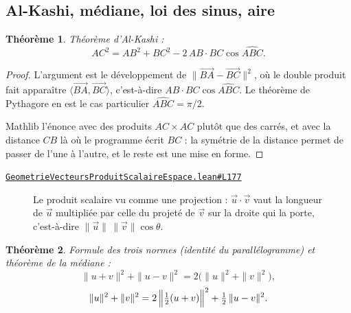 \documentclass[11pt,a4paper]{article}
\theoremstyle{definition}
\theoremstyle{plain}
\newtheorem{theoreme}{Théorème}
\newcommand{\source}[2]{\par\smallskip\noindent\hfill{\footnotesize\href{#1}{\texttt{#2}}}\par\smallskip}
\begin{document}
\subsection{Al-Kashi, médiane, loi des sinus, aire}

\begin{theoreme}
Théorème d'Al-Kashi :
\[ AC^{2} = AB^{2} + BC^{2} - 2\,AB \cdot BC \cos\widehat{ABC} . \]
\end{theoreme}

\begin{proof}
L'argument est le développement de
$\|\overrightarrow{BA} - \overrightarrow{BC}\|^{2}$, où le double produit fait apparaître
$\langle \overrightarrow{BA}, \overrightarrow{BC}\rangle$, c'est-à-dire
$AB \cdot BC \cos\widehat{ABC}$. Le théorème de Pythagore en est le cas particulier
$\widehat{ABC} = \pi/2$.

\medskip\noindent
Mathlib l'énonce avec des produits $AC \times AC$ plutôt que des carrés, et avec la distance
$CB$ là où le programme écrit $BC$ : la symétrie de la distance permet de passer de l'une à
l'autre, et le reste est une mise en forme.
\end{proof}
\source{https://github.com/Commutator-IO/learn-lean/blob/main/courses/02-lycee/08-geometrie-vecteurs-produit-scalaire-espace/GeometrieVecteursProduitScalaireEspace.lean\#L177}{GeometrieVecteursProduitScalaireEspace.lean\#L177}

\begin{figure}[h]
\centering

\caption{Le produit scalaire vu comme une projection : $\vec u \cdot \vec v$ vaut la longueur de $\vec u$ multipliée par celle du projeté de $\vec v$ sur la droite qui la porte, c'est-à-dire $\|\vec u\|\,\|\vec v\| \cos\theta$.}
\end{figure}

\begin{theoreme}
Formule des trois normes (identité du parallélogramme) et théorème de la médiane :
\[ \|u + v\|^{2} + \|u - v\|^{2} = 2\bigl(\|u\|^{2} + \|v\|^{2}\bigr) , \]
\[ \|u\|^{2} + \|v\|^{2} = 2\,\Bigl\|\tfrac{1}{2}(u + v)\Bigr\|^{2}
   + \tfrac{1}{2}\,\|u - v\|^{2} . \]
\end{theoreme}
\end{document}
